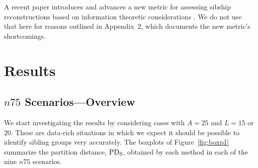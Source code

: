 A recent paper introduces and advances a new metric for assessing sibship reconstructions based on 
information theoretic considerations \citep{BrownDexter2012}.  We do not use that here for reasons 
outlined in Appendix~2, which documents the new metric's shortcomings.

\section*{Results}
\subsection*{$n75$ Scenarios---Overview}
We start investigating the results by considering cases with $A=25$ and $L=15$ or $20$. These are 
data-rich situations in which we expect it should be possible to identify sibling groups very accurately.  
The boxplots of Figure~\ref{fig:boxp1} summarize the partition distance, $\mathrm{PD_S}$, obtained by each 
method in each of the nine $n75$ scenarios. 


